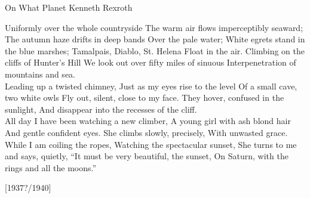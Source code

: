 \begin{poem}
    {On What Planet }
    {Kenneth Rexroth}

    Uniformly over the whole countryside 
    The warm air flows imperceptibly seaward; 
    The autumn haze drifts in deep bands 
    Over the pale water; 
    White egrets stand in the blue marshes; 
    Tamalpais, Diablo, St. Helena 
    Float in the air. 
    Climbing on the cliffs of Hunter's Hill 
    We look out over fifty miles of sinuous 
    Interpenetration of mountains and sea. \\

    Leading up a twisted chimney, 
    Just as my eyes rise to the level 
    Of a small cave, two white owls 
    Fly out, silent, close to my face. 
    They hover, confused in the sunlight, 
    And disappear into the recesses of the cliff. \\

    All day I have been watching a new climber, 
    A young girl with ash blond hair 
    And gentle confident eyes. 
    She climbs slowly, precisely, 
    With unwasted grace. 
    While I am coiling the ropes, 
    Watching the spectacular sunset, 
    She turns to me and says, quietly, 
    ``It must be very beautiful, the sunset, 
    On Saturn, with the rings and all the moons.'' 

\hfill                                                                                 [1937?/1940] 
\end{poem}



